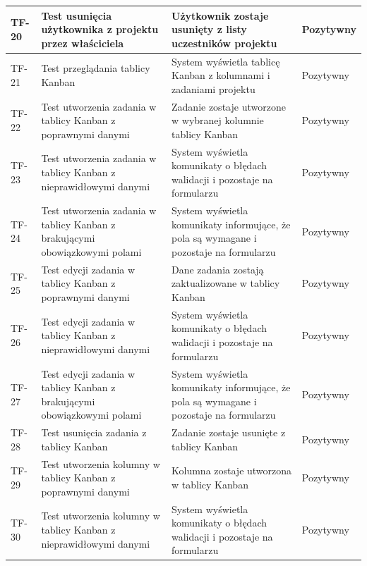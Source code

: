 \begin{longtable}{|p{2cm}|p{6cm}|p{5cm}|p{2.5cm}|}
TF-20 & Test usunięcia użytkownika z projektu przez właściciela & Użytkownik zostaje usunięty z listy uczestników projektu & Pozytywny \\ \hline

TF-21 & Test przeglądania tablicy Kanban & System wyświetla tablicę Kanban z kolumnami i zadaniami projektu & Pozytywny \\ \hline

TF-22 & Test utworzenia zadania w tablicy Kanban z poprawnymi danymi & Zadanie zostaje utworzone w wybranej kolumnie tablicy Kanban & Pozytywny \\ \hline

TF-23 & Test utworzenia zadania w tablicy Kanban z nieprawidłowymi danymi & System wyświetla komunikaty o błędach walidacji i pozostaje na formularzu & Pozytywny \\ \hline

TF-24 & Test utworzenia zadania w tablicy Kanban z brakującymi obowiązkowymi polami & System wyświetla komunikaty informujące, że pola są wymagane i pozostaje na formularzu & Pozytywny \\ \hline

TF-25 & Test edycji zadania w tablicy Kanban z poprawnymi danymi & Dane zadania zostają zaktualizowane w tablicy Kanban & Pozytywny \\ \hline

TF-26 & Test edycji zadania w tablicy Kanban z nieprawidłowymi danymi & System wyświetla komunikaty o błędach walidacji i pozostaje na formularzu & Pozytywny \\ \hline

TF-27 & Test edycji zadania w tablicy Kanban z brakującymi obowiązkowymi polami & System wyświetla komunikaty informujące, że pola są wymagane i pozostaje na formularzu & Pozytywny \\ \hline

TF-28 & Test usunięcia zadania z tablicy Kanban & Zadanie zostaje usunięte z tablicy Kanban & Pozytywny \\ \hline

TF-29 & Test utworzenia kolumny w tablicy Kanban z poprawnymi danymi & Kolumna zostaje utworzona w tablicy Kanban & Pozytywny \\ \hline

TF-30 & Test utworzenia kolumny w tablicy Kanban z nieprawidłowymi danymi & System wyświetla komunikaty o błędach walidacji i pozostaje na formularzu & Pozytywny \\ \hline


\end{longtable}
